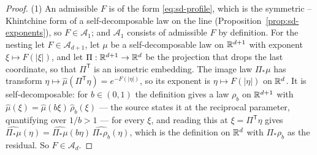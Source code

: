 \begin{proof}
(1) An admissible $F$ is of the form \ref{eq:sd-profile}, which is the symmetric
\Levy--Khintchine form of a self-decomposable law on the line (Proposition~\ref{prop:sd-exponents}), so
$F \in \mathcal{A}_1$; and $\mathcal{A}_1$ consists of admissible $F$ by definition. For the
nesting let $F \in \mathcal{A}_{d+1}$, let $\mu$ be a self-decomposable law on $\mathbb{R}^{d+1}$ with
exponent $\xi \mapsto F(|\xi|)$, and let $\Pi : \mathbb{R}^{d+1} \to \mathbb{R}^d$ be the projection that
drops the last coordinate, so that $\Pi^{\mathsf T}$ is an isometric embedding. The image law
$\Pi_*\mu$ has transform $\eta \mapsto \hat\mu(\Pi^{\mathsf T}\eta) = e^{-F(|\eta|)}$, so its
exponent is $\eta \mapsto F(|\eta|)$ on $\mathbb{R}^d$. It is self-decomposable: for $b \in (0,1)$ the
definition gives a law $\rho_b$ on $\mathbb{R}^{d+1}$ with $\hat\mu(\xi) = \hat\mu(b\xi)\,\hat\rho_b(\xi)$
--- the source states it at the reciprocal parameter, quantifying over $1/b > 1$ ---
for every $\xi$, and reading this at $\xi = \Pi^{\mathsf T}\eta$ gives
$\widehat{\Pi_*\mu}(\eta) = \widehat{\Pi_*\mu}(b\eta)\,\widehat{\Pi_*\rho_b}(\eta)$, which is the
definition on $\mathbb{R}^d$ with $\Pi_*\rho_b$ as the residual. So $F \in \mathcal{A}_d$.


\end{proof}
